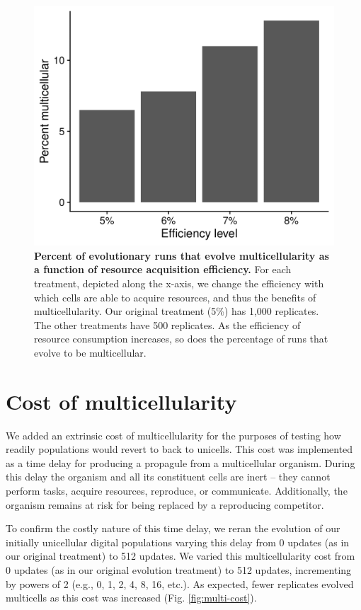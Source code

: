 \documentclass[
]{book}
\begin{document}
\begin{figure}
\centering
\includegraphics{images/Figure_S1_Percent_multicellular_by_efficiency_level.png}
\caption{\label{fig:mc2}\textbf{Percent of evolutionary runs that evolve multicellularity as a function of resource acquisition efficiency.} For each treatment, depicted along the x-axis, we change the efficiency with which cells are able to acquire resources, and thus the benefits of multicellularity. Our original treatment (5\%) has 1,000 replicates. The other treatments have 500 replicates. As the efficiency of resource consumption increases, so does the percentage of runs that evolve to be multicellular.}
\end{figure}

\hypertarget{cost-of-multicellularity}{%
\section{Cost of multicellularity}\label{cost-of-multicellularity}}

We added an extrinsic cost of multicellularity for the purposes of testing how readily populations would revert to back to unicells. This cost was implemented as a time delay for producing a propagule from a multicellular organism. During this delay the organism and all its constituent cells are inert -- they cannot perform tasks, acquire resources, reproduce, or communicate. Additionally, the organism remains at risk for being replaced by a reproducing competitor.

To confirm the costly nature of this time delay, we reran the evolution of our initially unicellular digital populations varying this delay from 0 updates (as in our original treatment) to 512 updates. We varied this multicellularity cost from 0 updates (as in our original evolution treatment) to 512 updates, incrementing by powers of 2 (e.g., 0, 1, 2, 4, 8, 16, etc.). As expected, fewer replicates evolved multicells as this cost was increased (Fig. \ref{fig:multi-cost}).
\end{document}
